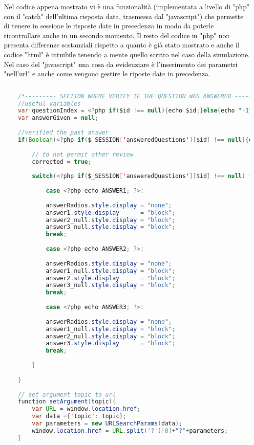 \textcolor{black}{Nel codice appena mostrato vi è una funzionalità (implementata a livello di "php" con il "catch" dell'ultima risposta data, trasmessa dal "javascript") che permette di tenere in sessione le risposte date in precedenza in modo da poterle ricontrollare anche in un secondo momento. Il resto del codice in "php" non presenta differenze sostanziali rispetto a quanto è già stato mostrato  e anche il codice "html" è intuibile tenendo a mente quello scritto nel caso della simulazione.\\
Nel caso del "javascript" una cosa da evidenziare è l'inserimento dei parametri "nell'url" e anche come vengono gestire le riposte date in precedenza.}\\

\begin{lstlisting}[language=java]
	
	/*--------- SECTION WHERE VERIFY IF THE QUESTION WAS ANSWERED ----------*/
	//useful variables
	var questionIndex = <?php if($id !== null){echo $id;}else{echo "-1";}?>;
	var answerGiven = null;
	
	//verified the past answer
	if(Boolean(<?php if($_SESSION['answeredQuestions'][$id] !== null){echo true;}else{echo false;}?>)){
		
		// to not permit other review
		corrected = true;
		
		switch(<?php if($_SESSION['answeredQuestions'][$id] !== null) {echo $_SESSION['answeredQuestions'][$id];}else{echo "-1";} ?>){
			
			case <?php echo ANSWER1; ?>:
			
			answerRadios.style.display = "none";
			answer1.style.display      = "block";
			answer2_null.style.display = "block";
			answer3_null.style.display = "block";
			break;
			
			case <?php echo ANSWER2; ?>:
			
			answerRadios.style.display = "none";
			answer1_null.style.display = "block";
			answer2.style.display      = "block";
			answer3_null.style.display = "block";
			break;
			
			case <?php echo ANSWER3; ?>:
			
			answerRadios.style.display = "none";
			answer1_null.style.display = "block";
			answer2_null.style.display = "block";
			answer3.style.display      = "block";
			break;
			
		}
		
	}
	
	// set argument topic to url
	function setArgument(topic){
		var URL = window.location.href;
		var data ={'topic': topic};
		var parameters = new URLSearchParams(data);
		window.location.href = URL.split('?')[0]+"?"+parameters;
	}


\end{lstlisting}
